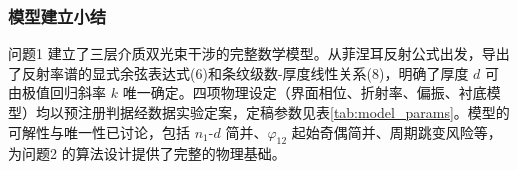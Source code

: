\subsubsection{模型建立小结}

问题1 建立了三层介质双光束干涉的完整数学模型。从菲涅耳反射公式出发，导出了反射率谱的显式余弦表达式(6)和条纹级数-厚度线性关系(8)，明确了厚度 $d$ 可由极值回归斜率 $k$ 唯一确定。四项物理设定（界面相位、折射率、偏振、衬底模型）均以预注册判据经数据实验定案，定稿参数见表\ref{tab:model_params}。模型的可解性与唯一性已讨论，包括 $n_1$-$d$ 简并、$\varphi_{12}$ 起始奇偶简并、周期跳变风险等，为问题2 的算法设计提供了完整的物理基础。